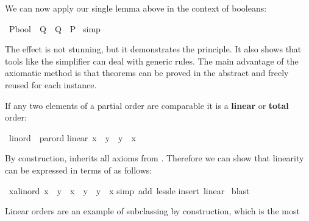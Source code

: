 \begin{isabellebody}
\begin{isamarkuptext}
We can now apply our single lemma above in the context of booleans:%
\end{isamarkuptext}%
\isamarkuptrue%
\ {\isachardoublequote}{\isacharparenleft}P{\isacharcolon}{\isacharcolon}bool{\isacharparenright}\ {\isacharless}{\isacharless}\ Q\ {\isasymLongrightarrow}\ {\isasymnot}{\isacharparenleft}Q\ {\isacharless}{\isacharless}\ P{\isacharparenright}{\isachardoublequote}\isanewline
\isamarkupfalse%
\ simp\isamarkupfalse%
%
\begin{isamarkuptext}%
\noindent
The effect is not stunning, but it demonstrates the principle.  It also shows
that tools like the simplifier can deal with generic rules.
The main advantage of the axiomatic method is that
theorems can be proved in the abstract and freely reused for each instance.%
\end{isamarkuptext}%
\isamarkuptrue%
%
\isamarkuptrue%
%
\begin{isamarkuptext}%
If any two elements of a partial order are comparable it is a
\textbf{linear} or \textbf{total} order:%
\end{isamarkuptext}%
\isamarkuptrue%
\ linord\ {\isacharless}\ parord\isanewline
linear{\isacharcolon}\ {\isachardoublequote}x\ {\isacharless}{\isacharless}{\isacharequal}\ y\ {\isasymor}\ y\ {\isacharless}{\isacharless}{\isacharequal}\ x{\isachardoublequote}\isamarkupfalse%
%
\begin{isamarkuptext}%
\noindent
By construction,  inherits all axioms from .
Therefore we can show that linearity can be expressed in terms of \isa{{\isacharless}{\isacharless}}
as follows:%
\end{isamarkuptext}%
\isamarkuptrue%
\ {\isachardoublequote}{\isasymAnd}x{\isacharcolon}{\isacharcolon}{\isacharprime}a{\isacharcolon}{\isacharcolon}linord{\isachardot}\ x\ {\isacharless}{\isacharless}\ y\ {\isasymor}\ x\ {\isacharequal}\ y\ {\isasymor}\ y\ {\isacharless}{\isacharless}\ x{\isachardoublequote}\isanewline
\isamarkupfalse%
simp\ add{\isacharcolon}\ less{\isacharunderscore}le{\isacharparenright}\isanewline
\isamarkupfalse%
insert\ linear{\isacharparenright}\isanewline
\isamarkupfalse%
\ blast\isanewline
\isamarkupfalse%
\isamarkupfalse%
%
\begin{isamarkuptext}%
Linear orders are an example of subclassing
by construction, which is the most

\end{isamarkuptext}
\end{isabellebody}
